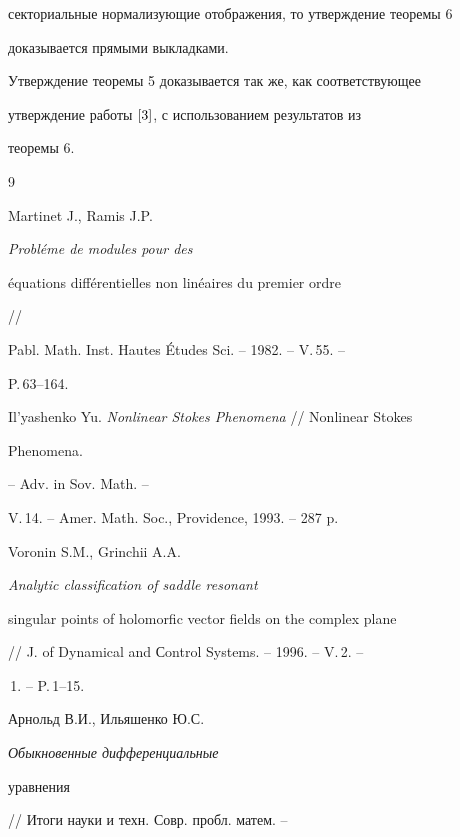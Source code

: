 секториальные нормализующие отображения, то утверждение теоремы 6


доказывается прямыми выкладками.





Утверждение теоремы 5 доказывается так же, как соответствующее


утверждение работы $\cite{3}$, с использованием результатов из


теоремы 6.





\begin{thebibliography}{9}







Martinet J., Ramis J.P. {\em Probl\'eme de modules pour des


\'equations diff\'erentielles non lin\'eaires du premier ordre} //


Pabl. Math. Inst. Hautes \' Etudes Sci. -- 1982. -- V.\,55. --


P.\,63--164.







Il'yashenko Yu. {\em Nonlinear Stokes Phenomena} // Nonlinear Stokes


Phenomena.




-- Adv. in Sov. Math. --


V.\,14. -- Amer. Math. Soc., Providence, 1993. -- 287 p.







Voronin S.M., Grinchii A.A. {\em Analytic classification of saddle resonant


singular points of holomorfic vector fields on the complex plane}


// J. of Dynamical and Сontrol Systems. -- 1996. -- V.\,2. --


\No\,1. -- P.\,1--15.







Арнольд В.И., Ильяшенко Ю.С. {\em Обыкновенные дифференциальные


уравнения} // Итоги науки и техн. Совр. пробл. матем. --



\end{thebibliography}

